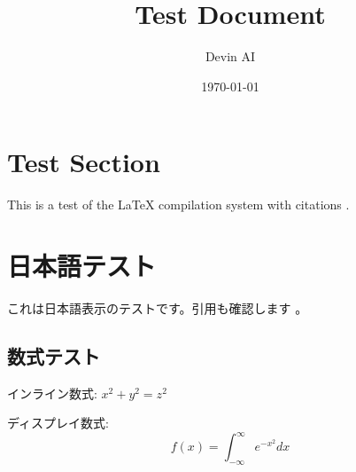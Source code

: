 \documentclass[a4paper,12pt]{article}
\title{Test Document}
\author{Devin AI}
\date{\today}
\begin{document}
\maketitle

\section{Test Section}

This is a test of the \LaTeX{} compilation system with citations \citep{buterin2019flexible}.

\section{日本語テスト}

これは日本語表示のテストです。引用も確認します \citep{weyl2022decentralized}。

\subsection{数式テスト}

インライン数式: $x^2 + y^2 = z^2$

ディスプレイ数式:
\[
f(x) = \int_{-\infty}^{\infty} e^{-x^2} dx
\]



\end{document}

